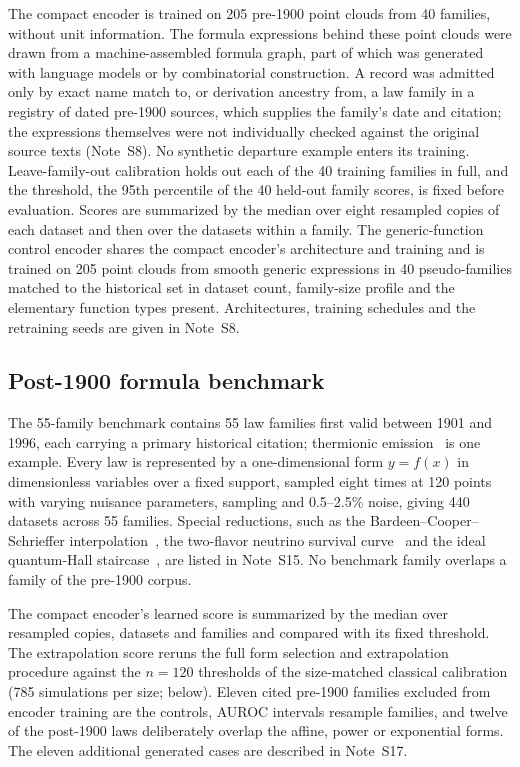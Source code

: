 \documentclass{article}
\begin{document}
The compact encoder is trained on 205 pre-1900 point clouds from 40 families, without unit information. The formula expressions behind these point clouds were drawn from a machine-assembled formula graph, part of which was generated with language models or by combinatorial construction. A record was admitted only by exact name match to, or derivation ancestry from, a law family in a registry of dated pre-1900 sources, which supplies the family's date and citation; the expressions themselves were not individually checked against the original source texts (Note~S8). No synthetic departure example enters its training. Leave-family-out calibration holds out each of the 40 training families in full, and the threshold, the 95th percentile of the 40 held-out family scores, is fixed before evaluation. Scores are summarized by the median over eight resampled copies of each dataset and then over the datasets within a family. The generic-function control encoder shares the compact encoder's architecture and training and is trained on 205 point clouds from smooth generic expressions in 40 pseudo-families matched to the historical set in dataset count, family-size profile and the elementary function types present. Architectures, training schedules and the retraining seeds are given in Note~S8.

\subsection{Post-1900 formula benchmark}

The 55-family benchmark contains 55 law families
first valid between 1901 and 1996, each carrying a primary historical citation; thermionic
emission~\cite{richardson1901} is one example. Every law is represented by a one-dimensional form $y = f(x)$ in dimensionless variables over a fixed
support, sampled eight times at 120 points with varying nuisance parameters,
sampling and 0.5--2.5\% noise, giving 440 datasets across 55 families. Special
reductions, such as the Bardeen--Cooper--Schrieffer interpolation~\cite{bardeen1957}, the two-flavor
neutrino survival curve~\cite{maki1962} and the ideal quantum-Hall
staircase~\cite{klitzing1980}, are listed in Note~S15. No benchmark family overlaps a family of the pre-1900 corpus.

The compact encoder's learned score is summarized by the median over resampled copies, datasets and families and compared with its fixed threshold. The extrapolation score reruns the full form selection and
extrapolation procedure against the $n = 120$ thresholds of the size-matched classical calibration (785 simulations per size; below). Eleven cited
pre-1900 families excluded from encoder training are the controls, AUROC intervals resample families, and
twelve of the post-1900 laws deliberately overlap the affine, power or exponential forms. The eleven additional generated cases are described in Note~S17.
\end{document}
